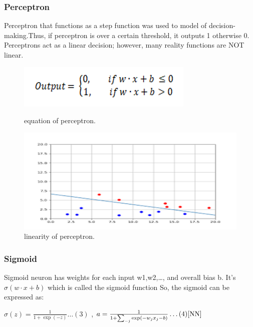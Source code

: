\documentclass{article}
\begin{document}
\subsubsection{Perceptron}
Perceptron that functions as a step function was used to model of decision-making.Thus, if perceptron is over a certain threshold, it outputs 1 otherwise 0.
Perceptrons act as a linear decision; however, many reality functions are NOT linear.
\begin{figure}[H]
  \centering
  \begin{minipage}[b]{0.3\textwidth}
    \includegraphics[width=\textwidth]{img/percept.png}
    \caption{equation of perceptron.}
  \end{minipage}
  \hfill
  \begin{minipage}[b]{0.5\textwidth}
    \includegraphics[width=\textwidth]{img/percept2.png}
    \caption{linearity of perceptron.\protect\cite{Percept}}
  \end{minipage}
\end{figure}

\subsubsection{Sigmoid}
Sigmoid neuron has weights for each input w1,w2,\dots , and overall bias b. 
It’s $\sigma{(w \cdot x+b)}$ which is called the sigmoid function
So, the sigmoid can be expressed as:

$\sigma{(z)} =\frac{1}{1+\exp(-z)} \dots (3)$ 
, $a =\frac{1}{1+\sum_{-j}\exp(-w_jx_j-b)} \dots  (4)\cite{NN}$
\end{document}
